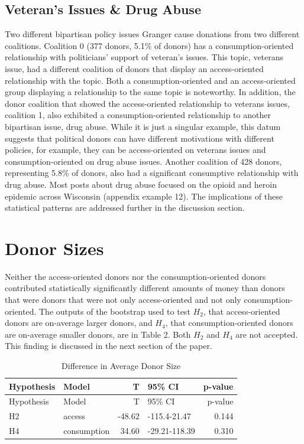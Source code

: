\documentclass[12pt,]{article}
\begin{document}
\hypertarget{veterans-issues-drug-abuse}{%
\subsection{Veteran's Issues \& Drug
Abuse}\label{veterans-issues-drug-abuse}}

Two different bipartisan policy issues Granger cause donations from two
different coalitions. Coalition 0 (377 donors, 5.1\% of donors) has a
consumption-oriented relationship with politicians' support of veteran's
issues. This topic, veterans issue, had a different coalition of donors
that display an access-oriented relationship with the topic. Both a
consumption-oriented and an access-oriented group displaying a
relationship to the same topic is noteworthy. In addition, the donor
coalition that showed the access-oriented relationship to veterans
issues, coalition 1, also exhibited a consumption-oriented relationship
to another bipartisan issue, drug abuse. While it is just a singular
example, this datum suggests that political donors can have different
motivations with different policies, for example, they can be
access-oriented on veterans issues and consumption-oriented on drug
abuse issues. Another coalition of 428 donors, representing 5.8\% of
donors, also had a significant consumptive relationship with drug abuse.
Most posts about drug abuse focused on the opioid and heroin epidemic
across Wisconsin (appendix example 12). The implications of these
statistical patterns are addressed further in the discussion section.

\hypertarget{donor-sizes}{%
\section{Donor Sizes}\label{donor-sizes}}

Neither the access-oriented donors nor the consumption-oriented donors
contributed statistically significantly different amounts of money than
donors that were donors that were not only access-oriented and not only
consumption-oriented. The outputs of the bootstrap used to test
\(H_{2}\), that access-oriented donors are on-average larger donors, and
\(H_{4}\), that consumption-oriented donors are on-average smaller
donors, are in Table 2. Both \(H_{2}\) and \(H_{4}\) are not accepted.
This finding is discussed in the next section of the paper.

\begin{longtable}[]{@{}llrlr@{}}
\caption{Difference in Average Donor Size}\tabularnewline
\toprule
Hypothesis & Model & T & 95\% CI & p-value\tabularnewline
\midrule
\endfirsthead
\toprule
Hypothesis & Model & T & 95\% CI & p-value\tabularnewline
\midrule
\endhead
H2 & access & -48.62 & -115.4-21.47 & 0.144\tabularnewline
H4 & consumption & 34.60 & -29.21-118.39 & 0.310\tabularnewline
\bottomrule
\end{longtable}
\end{document}
